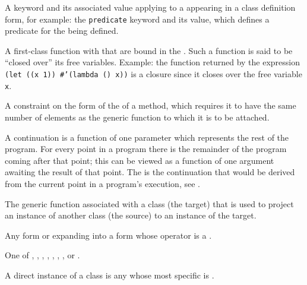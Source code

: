 \begin{optDefinition}
\begin{definitions}
     A keyword and its
    associated value applying to a  appearing in a class definition
    form, for example: the {\tt predicate} keyword and its value, which defines
    a predicate  for the  being defined.

     A first-class function with
     that are bound in the . Such a
    function is said to be ``closed over'' its free variables.  Example: the
    function returned by the expression {\tt (let ((x 1)) \#'(lambda () x))} is
    a closure since it closes over the free variable {\tt x}.

     A constraint on the form of
    the  of a method, which requires it to have the same
    number of elements as the generic function to which it is to be attached.

     A continuation is a
    function of one parameter which represents the rest of the program.  For
    every point in a program there is the remainder of the program coming after
    that point; this can be viewed as a function of one argument awaiting the
    result of that point.  The  is the continuation
    that would be derived from the current point in a program's execution, see
    .

     The
    generic function associated with a class (the target) that is used to
    project an instance of another class (the source) to an instance of the
    target.

     Any form or
     expanding into a form whose operator is a .

     One of
    , , ,
    , , ,
    , or .

     A direct instance of a class
     is any  whose most specific  is
    .


\end{definitions}
\end{optDefinition}
